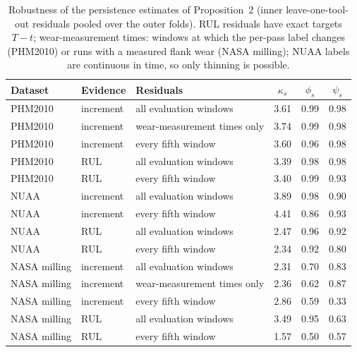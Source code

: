 \begin{table}[!htbp]
\centering
\caption{Robustness of the persistence estimates of Proposition~2 (inner leave-one-tool-out residuals pooled over the outer folds). RUL residuals have exact targets $T-t$; wear-measurement times: windows at which the per-pass label changes (PHM2010) or runs with a measured flank wear (NASA milling); NUAA labels are continuous in time, so only thinning is possible.}
\label{tab:Spersist}
\footnotesize\setlength{\tabcolsep}{4pt}
\begin{tabular}{lllccc}
\toprule
Dataset & Evidence & Residuals & $\kappa_s$ & $\phi_s$ & $\psi_s$\\
\midrule
PHM2010 & increment & all evaluation windows & 3.61 & 0.99 & 0.98\\
PHM2010 & increment & wear-measurement times only & 3.74 & 0.99 & 0.98\\
PHM2010 & increment & every fifth window & 3.60 & 0.96 & 0.98\\
PHM2010 & RUL & all evaluation windows & 3.39 & 0.98 & 0.98\\
PHM2010 & RUL & every fifth window & 3.40 & 0.99 & 0.93\\
\midrule
NUAA & increment & all evaluation windows & 3.89 & 0.98 & 0.90\\
NUAA & increment & every fifth window & 4.41 & 0.86 & 0.93\\
NUAA & RUL & all evaluation windows & 2.47 & 0.96 & 0.92\\
NUAA & RUL & every fifth window & 2.34 & 0.92 & 0.80\\
\midrule
NASA milling & increment & all evaluation windows & 2.31 & 0.70 & 0.83\\
NASA milling & increment & wear-measurement times only & 2.36 & 0.62 & 0.87\\
NASA milling & increment & every fifth window & 2.86 & 0.59 & 0.33\\
NASA milling & RUL & all evaluation windows & 3.49 & 0.95 & 0.63\\
NASA milling & RUL & every fifth window & 1.57 & 0.50 & 0.57\\
\bottomrule
\end{tabular}
\end{table}
